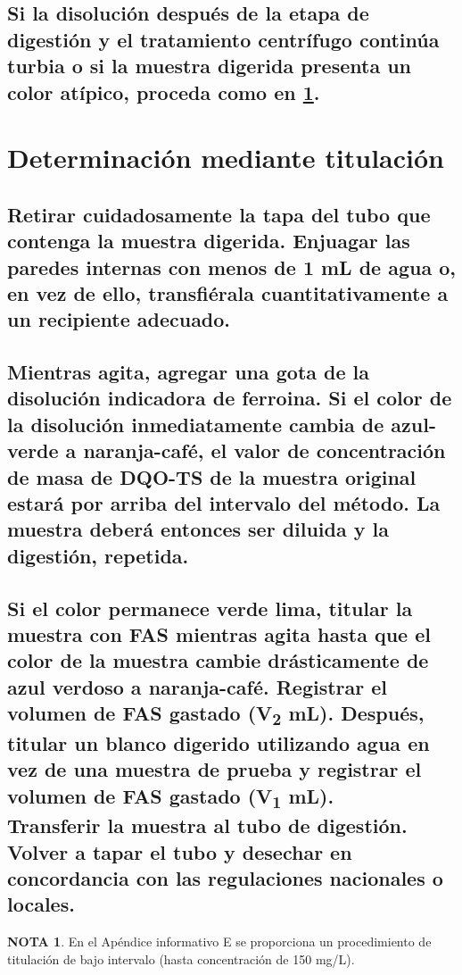 \documentclass[spanish,12pt,letterpaper,titlepage]{article}
\theoremstyle{definition}
\newtheorem{teor}{NOTA}
\begin{document}
	\subsection{Si la disolución después de la etapa de digestión y el tratamiento centrífugo continúa turbia o si la muestra digerida presenta un color atípico, proceda como en \ref{10.3}.} \label{10.2.3}
	\section{Determinación mediante titulación} \label{10.3}
	\subsection{Retirar cuidadosamente la tapa del tubo que contenga la muestra digerida. Enjuagar las paredes internas con menos de 1 mL de agua o, en vez de ello, transfiérala cuantitativamente a un recipiente adecuado.} \label{10.3.1}
	\subsection{Mientras agita, agregar una gota de la disolución indicadora de ferroina. Si el color de la disolución inmediatamente cambia de azul-verde a naranja-café, el valor de concentración de masa de DQO-TS de la muestra original estará por arriba del intervalo del método. La muestra deberá entonces ser diluida y la digestión, repetida.} \label{10.3.2}
	\subsection{Si el color permanece verde lima, titular la muestra con FAS mientras agita hasta que el color de la muestra cambie drásticamente de azul verdoso a naranja-café. Registrar el volumen de FAS gastado (V\textsubscript{2} mL). Después, titular un blanco digerido utilizando agua en vez de una muestra de prueba y registrar el volumen de FAS gastado (V\textsubscript{1} mL).\\ Transferir la muestra al tubo de digestión. Volver a tapar el tubo y desechar en concordancia con las regulaciones nacionales o locales.} \label{10.3.3}
	\begin{teor}
		En el Apéndice informativo E se proporciona un procedimiento de titulación de bajo intervalo (hasta concentración de 150 mg/L).
	\end{teor}
\end{document}
